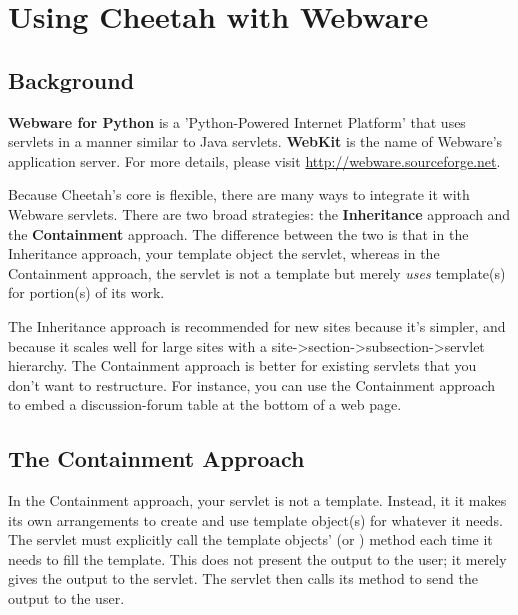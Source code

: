 \section{Using Cheetah with Webware}
\label{webware}

\subsection{Background}
\label{webware.background}

{\bf Webware for Python} is a 'Python-Powered Internet Platform' that uses
servlets in a manner similar to Java servlets.  {\bf WebKit} is the name of
Webware's application server.  For more details, please visit
\url{http://webware.sourceforge.net}.

Because Cheetah's core is flexible, there are many ways to integrate it with
Webware servlets.  There are two broad strategies: the {\bf Inheritance}
approach and the {\bf Containment} approach.  The difference between the two is
that in the Inheritance approach, your template object  the
servlet, whereas in the Containment approach, the servlet is not a template but
merely {\em uses} template(s) for portion(s) of its work.

The Inheritance approach is recommended for new sites because it's simpler, and
because it scales well for large sites with a
site->section->subsection->servlet hierarchy.  The Containment approach is
better for existing servlets that you don't want to restructure.  For instance,
you can use the Containment approach to embed a discussion-forum table at the
bottom of a web page.


\subsection{The Containment Approach}
\label{webware.containment}

In the Containment approach, your servlet is not a template.  Instead, it 
it makes its own arrangements to create and use template object(s) for whatever
it needs.  The servlet must explicitly call the template objects'
 (or ) method each time it needs to fill
the template.  This does not present the output to the user; it merely gives
the output to the servlet.  The servlet then calls its
 method to send the output to the user.

